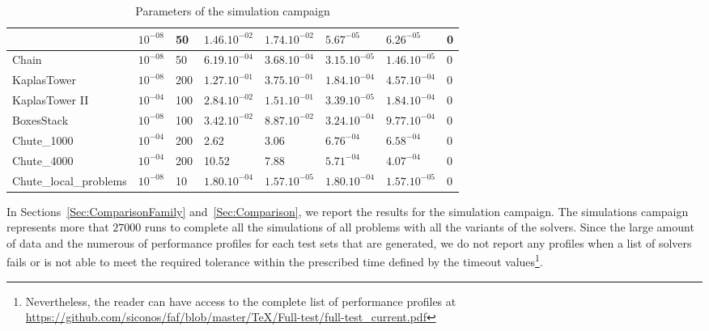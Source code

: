 \begin{table}
\begin{tabular}{|l|l|l|l|l|l|l|l|}
  & $10^{-08}$
  & 50
  & $1.46.10^{-02}$
  & $1.74.10^{-02}$
  & $5.67^{-05}$
  & $6.26^{-05}$
  & 0
  \\
  \hline
  Chain
  & $10^{-08}$
  & 50
  & $6.19.10^{-04}$
  & $3.68.10^{-04}$
  & $3.15.10^{-05}$
  & $1.46.10^{-05}$
  & 0
  \\
  \hline
  KaplasTower
  & $10^{-08}$
  & 200
  & $1.27.10^{-01}$
  & $3.75.10^{-01}$
  & $1.84.10^{-04}$
  & $4.57.10^{-04}$
  & 0
  \\
  \hline
  KaplasTower II
  & $10^{-04}$
  & 100
  & $2.84.10^{-02}$
  & $1.51.10^{-01}$
  & $3.39.10^{-05}$
  & $1.84.10^{-04}$
  & 0
  \\
  \hline
  BoxesStack
  & $10^{-08}$
  & 100
  & $3.42.10^{-02}$
  & $8.87.10^{-02}$
  & $3.24.10^{-04}$
  & $9.77.10^{-04}$
  & 0
  \\
  \hline
  Chute\_1000
  & $10^{-04}$
  & 200
  & 2.62
  & 3.06
  & $6.76^{-04}$
  & $6.58^{-04}$
  & 0
  \\
  \hline
  Chute\_4000
  & $10^{-04}$
  & 200
  & 10.52
  & 7.88
  & $5.71^{-04}$
  & $4.07^{-04}$
  & 0
  \\
  \hline
  Chute\_local\_problems
  & $10^{-08}$
  & 10
  & $1.80.10^{-04}$
  & $1.57.10^{-05}$
  & $1.80.10^{-04}$
  & $1.57.10^{-05}$
  &  0 \\
  \hline
\end{tabular}
\caption{Parameters of the simulation campaign}
\label{Tab:fclib-simulation}
\end{table}

In Sections~\ref{Sec:ComparisonFamily} and~\ref{Sec:Comparison}, we report the results for the simulation campaign. The simulations campaign represents more that $27000$ runs to complete all the simulations of all problems with all the variants of the solvers.  Since the large amount of data and the numerous of performance profiles for each test sets that are generated, we do not report any profiles  when a list of solvers fails or is not able to meet the required tolerance within the prescribed time defined by the timeout values\footnote{Nevertheless, the reader can have access to the complete list of performance profiles at \href{https://github.com/siconos/faf/blob/master/TeX/Full-test/full-test_current.pdf}{https://github.com/siconos/faf/blob/master/TeX/Full-test/full-test\_current.pdf}}.


